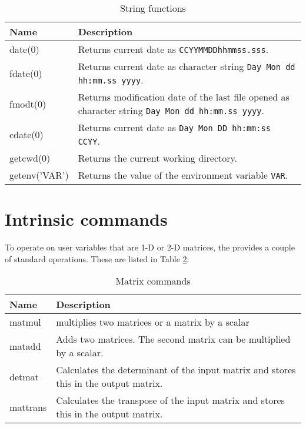 \begin{table}[!tbh]
\centering
\begin{tabularx}{\textwidth}{|p{30mm}|X|}
  \hline
  {\bf Name} & {\bf Description} \\
  \hline\hline
  date(0)        & Returns current date as {\tt CCYYMMDDhhmmss.sss}.\\
  fdate(0)       & Returns current date as character string {\tt Day Mon dd hh:mm.ss yyyy}.\\
  fmodt(0)       & Returns modification date of the last file opened 
                   as character string {\tt Day Mon dd hh:mm.ss yyyy}.\\
  cdate(0)       & Returns current date as {\tt Day Mon DD hh:mm:ss CCYY}.\\
  getcwd(0)      & Returns the current working directory.\\
  getenv('VAR')  & Returns the value of the environment variable
                   {\tt VAR}.\\
  \hline
\end{tabularx}
\caption{\label{func-char}String functions}
\end{table}



\section{Intrinsic commands  \label{cmds}}

To operate on user variables that are 1-D or 2-D matrices, the \Suite 
provides a couple of standard operations. These are listed in Table \ref{cmds-cmds}:

\begin{table}[!tbh]
\centering
\begin{tabularx}{\textwidth}{|p{30mm}|X|}
  \hline
  {\bf Name} & {\bf Description} \\
  \hline\hline
  matmul         & multiplies two matrices or a matrix by a scalar  \\
  matadd         & Adds two matrices. The second matrix can be multiplied by a scalar. \\
  detmat         & Calculates the determinant of the input matrix and stores this in 
                   the output matrix. \\
  mattrans       & Calculates the transpose of the input matrix and stores this in 
                   the output matrix. \\
  \hline
\end{tabularx}
\caption{\label{cmds-cmds}Matrix commands}
\end{table}

